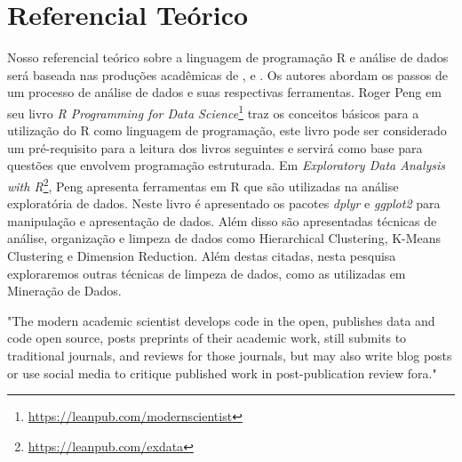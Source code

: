 \chapter[Referencial Teórico]{Referencial Teórico}

Nosso referencial teórico sobre a linguagem de programação R e análise de dados 
será baseada nas produções acadêmicas de ,  e 
. Os autores abordam os passos de um processo de análise de dados e 
suas respectivas ferramentas. Roger Peng em seu livro \emph{R Programming for Data 
Science}\footnote{\url{https://leanpub.com/modernscientist}}  traz os conceitos básicos para a utilização do R como linguagem de 
programação, este livro pode ser considerado um pré-requisito para a leitura dos 
livros seguintes e servirá como base para questões que envolvem programação 
estruturada. Em \emph{Exploratory Data Analysis with R}\footnote{\url{https://leanpub.com/exdata}}, Peng apresenta ferramentas 
em R que são utilizadas na análise exploratória de dados. Neste livro é 
apresentado os pacotes \emph{dplyr} e \emph{ggplot2} para manipulação e apresentação de 
dados. Além disso são apresentadas técnicas de análise, organização e limpeza de 
dados como Hierarchical Clustering, K-Means Clustering e Dimension Reduction. 
Além destas citadas, nesta pesquisa exploraremos outras técnicas de limpeza de 
dados, como as utilizadas em Mineração de Dados.

\begin{citacao}[english]
  "The modern academic scientist develops code in the open, publishes data and 
code open source, posts preprints of their academic work, still submits to 
traditional journals, and reviews for those journals, but may also write blog 
posts or use social media to critique published work in post-publication review 
fora."\cite{Peng2015}
\end{citacao}

